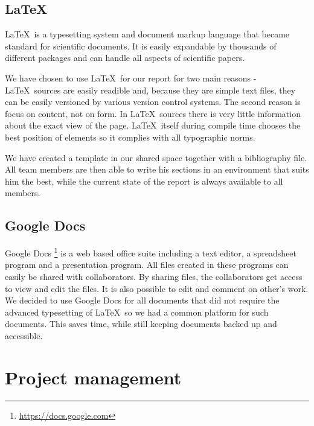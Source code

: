 \documentclass[11pt,a4paper,titlepage,oneside]{report}
\begin{document}
  \subsection{\LaTeX}
  \LaTeX~is a typesetting system and document markup language that became standard for scientific documents. It is easily expandable by thousands of different packages and can handle all aspects of scientific papers.

  We have chosen to use \LaTeX~for our report for two main reasons - \LaTeX~sources are easily readible and, because they are simple text files, they can be easily versioned by various version control systems. The second reason is focus on content, not on form. In \LaTeX~sources there is very little information about the exact view of the page. \LaTeX~itself during compile time chooses the best position of elements so it complies with all typographic norms.

  We have created a template in our shared space together with a bibliography file. All team members are then able to write his sections in an environment that suits him the best, while the current state of the report is always available to all members.

  \subsection{Google Docs}
  Google Docs \footnote{\url{https://docs.google.com}} is a web based office suite including a text editor, a spreadsheet program and a presentation program. All files created in these programs can easily be shared with collaborators. By sharing files, the collaborators get access to view and edit the files. It is also possible to edit and comment on other's work. We decided to use Google Docs for all documents that did not require the advanced typesetting of \LaTeX~so we had a common platform for such documents. This saves time, while still keeping documents backed up and accessible. 

\section{Project management}
\end{document}
